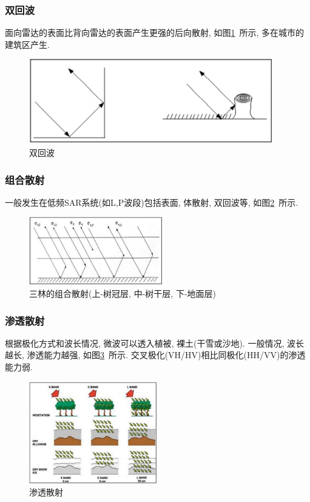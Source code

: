 \subsubsection{双回波}
面向雷达的表面比背向雷达的表面产生更强的后向散射, 如图\ref{fig:0105}~所示, 多在城市的建筑区产生.
\begin{figure}[htbp]
    \centering
    \includegraphics[height=10em]{pic/chap01xx04.jpg}
    \caption{双回波}
    \label{fig:0105}
\end{figure}

\subsubsection{组合散射}
一般发生在低频SAR系统(如L,P波段)包括表面, 体散射, 双回波等, 如图\ref{fig:0106}~所示.
\begin{figure}[htbp]
    \centering
    \includegraphics[height=8em]{pic/chap01xx05.jpg}
    \caption{三林的组合散射(上-树冠层, 中-树干层, 下-地面层)}
    \label{fig:0106}
\end{figure}

\subsubsection{渗透散射}
根据极化方式和波长情况, 微波可以透入植被, 裸土(干雪或沙地). 一般情况, 波长越长, 渗透能力越强, 如图\ref{fig:0107}~所示. 交叉极化(VH/HV)相比同极化(HH/VV)的渗透能力弱.
\begin{figure}[!htbp]
    \centering
    \includegraphics[height=12em]{pic/chap01xx06.jpg}
    \caption{渗透散射}
    \label{fig:0107}
\end{figure}

